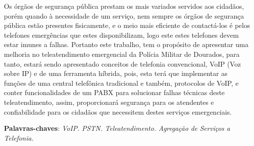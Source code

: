 \setlength{\absparsep}{18pt} %
\begin{resumo}

Os órgãos de segurança pública prestam os mais variados servidos aos cidadãos, porém quando à necessidade de um serviço, nem sempre os órgãos de segurança pública estão presentes fisicamente, e o meio mais eficiente de contactá-los é pelos telefones emergências que estes disponibilizam, logo este estes telefones devem estar imunes a falhas. Portanto este trabalho, tem o propósito de apresentar uma melhoria no teleatendimento emergencial da Polícia Militar de Dourados, para tanto, estará sendo apresentado conceitos de telefonia convencional, VoIP (Voz sobre IP) e de uma ferramenta híbrida, pois, esta terá que implementar as funções de uma central telefônica tradicional e também, protocolos de VoIP, e conter funcionalidades de um PABX para solucionar falhas técnicas deste teleatendimento, assim, proporcionará segurança para os atendentes e confiabilidade para os cidadãos que necessitem destes serviços emergenciais.

 \textbf{Palavras-chaves}: \textit{VoIP. PSTN. Teleatendimento. Agregação de Serviços a Telefonia.}
\end{resumo}
